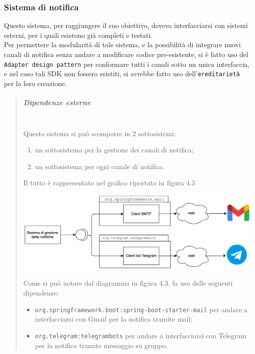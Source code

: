         \subsubsection{Sistema di notifica}
            Questo sistema, per raggiungere il suo obiettivo, doveva interfacciarsi con sistemi esterni, per i quali esistono già  completi e testati. \\
            Per permettere la modularità di tale sistema, e la possibilità di integrare nuovi canali di notifica senza andare a modificare codice pre-esistente, si è fatto uso del \texttt{Adapter design pattern} per conformare tutti i canali sotto un unica interfaccia, e nel caso tali SDK non fossero esistiti, si avrebbe fatto uso dell'\texttt{ereditarietà} per la loro creazione.
            \begin{quote}
            	\mbox{}%
            	\vspace{-1cm}
                    
                    \subparagraph{Dipendenze esterne}
                    \mbox{} \\
                        Questo sistema si può scomporre in 2 sottosistemi:
                        \begin{enumerate}
                            \item un sottosistema per la gestione dei canali di notifica;
                            \item un sottosistema per ogni canale di notifica.
                        \end{enumerate}
                        Il tutto è rappresentato nel grafico riportato in figura 4.3
                        \begin{center}
                            \includegraphics[keepaspectratio = true, width=14cm]{immagini/progettazione/notifica.png}
                        \end{center}
                        Come si può notare dal diagramma in figura 4.3, fa uso delle seguenti dipendenze:
                        \begin{itemize}
                            \item \texttt{org.springframework.boot:spring-boot-starter-mail} per andare a interfacciarsi con Gmail per la notifica tramite mail;
                            \item \texttt{org.telegram:telegrambots} per andare a interfacciarsi con Telegram per la notifica tramite messaggio su gruppo.
                        \end{itemize} 
            \end{quote}
